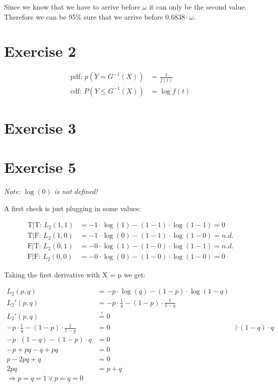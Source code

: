 Since we know that we have to arrive before $\omega$ it can only be the second value. Therefore we can be 95\% sure that we arrive before $0.6838 \cdot \omega$.


\section*{Exercise 2}
\begin{align*}
\mbox{pdf: } p\left(Y   =  G^{-1}\left(X\right)\right) &= \frac{1}{f\left(t\right)} \\
\mbox{cdf: } P\left(Y \leq G^{-1}\left(X\right)\right) &= \log{f\left(t\right)}
\end{align*}


\section*{Exercise 3}



\section*{Exercise 5}
\textit{Note: $\log{\left(0\right)}$ is not defined!}

A first check is just plugging in some values:

\begin{align*}
\mbox{T|T: }L_2(1,1) &= -1 \cdot \log{\left( 1 \right)} - (1 - 1) \cdot \log{\left(1 - 1\right)} = 0    \\
\mbox{T|F: }L_2(1,0) &= -1 \cdot \log{\left( 0 \right)} - (1 - 1) \cdot \log{\left(1 - 0\right)} = n.d. \\
\mbox{F|T: }L_2(0,1) &= -0 \cdot \log{\left( 1 \right)} - (1 - 0) \cdot \log{\left(1 - 1\right)} = n.d. \\
\mbox{F|F: }L_2(0,0) &= -0 \cdot \log{\left( 0 \right)} - (1 - 0) \cdot \log{\left(1 - 0\right)} = 0
\end{align*}


Taking the first derivative with X = p we get:

\begin{align*}
  L_2 (p,q) &= -p \cdot \log{\left(q \right)} - (1-p) \cdot \log{\left(1-q \right)} \\
  L_2' (p,q) &= -p \cdot \frac{1}{q} - (1-p) \cdot \frac{1}{1-q} \\
  L_2' (p,q) &\stackrel{!}{=} 0 \\
   -p \cdot \frac{1}{q} - (1-p) \cdot \frac{1}{1-q} &= 0 &| \cdot (1-q) \cdot q \\
  -p \cdot (1-q) - (1-p) \cdot q & = 0 \\
  -p + pq - q + pq &= 0\\
  p - 2pq + q &= 0 \\
  2pq &= p+q \\
  \Rightarrow p = q = 1 \vee p = q = 0
\end{align*}

